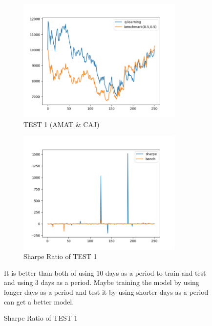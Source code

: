 \begin{figure}[H]
\begin{subfigure}{.5\textwidth}
\includegraphics[clip, width=0.9\textwidth]{Graphics/TESTFC3Dby10train.png} \caption{TEST 1 (AMAT \& CAJ)} 
\end{subfigure}%
\begin{subfigure}{.5\textwidth}%
\centering
\includegraphics[clip, width=0.9\textwidth]{Graphics/TestFC3Dby10trainS.png} \caption{Sharpe Ratio of TEST 1}
\end{subfigure}%

\vspace{0.4cm}

It is better than both of using 10 days as a period to train and test and using 3 days as a period. Maybe training the model by using longer days as a period and test it by using shorter days as a period can get a better model.

\end{figure}

